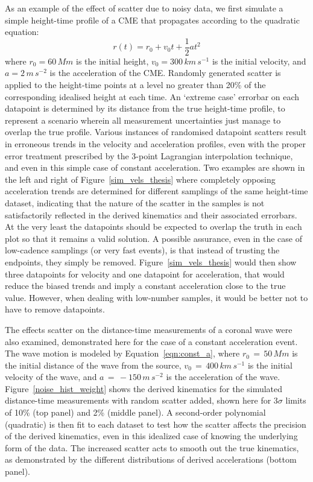 \documentclass[structabstract]{aa}
\begin{document}
As an example of the effect of scatter due to noisy data, we first simulate a simple height-time profile of a CME that propagates according to the quadratic equation:
\begin{equation}
\label{eqn:const_a}
r(t) = r_0 + v_0 t + \frac{1}{2}a t^2
\end{equation}
where $r_0=60\,Mm$ is the initial height, $v_0=300\,km\,s^{-1}$ is the initial velocity, and $a=2\,m\,s^{-2}$ is the acceleration of the CME. Randomly generated scatter is applied to the height-time points at a level no greater than 20\% of the corresponding idealised height at each time. An `extreme case' errorbar on each datapoint is determined by its distance from the true height-time profile, to represent a scenario wherein all measurement uncertainties just manage to overlap the true profile. Various instances of randomised datapoint scatters result in erroneous trends in the velocity and acceleration profiles, even with the proper error treatment prescribed by the 3-point Lagrangian interpolation technique, and even in this simple case of constant acceleration. Two examples are shown in the left and right of Figure~\ref{sim_vels_thesis} where completely opposing acceleration trends are determined for different samplings of the same height-time dataset, indicating that the nature of the scatter in the samples is not satisfactorily reflected in the derived kinematics and their associated errorbars. At the very least the datapoints should be expected to overlap the truth in each plot so that it remains a valid solution. A possible assurance, even in the case of low-cadence samplings (or very fast events), is that instead of trusting the endpoints, they simply be removed. Figure~\ref{sim_vels_thesis} would then show three datapoints for velocity and one datapoint for acceleration, that would reduce the biased trends and imply a constant acceleration close to the true value. However, when dealing with low-number samples, it would be better not to have to remove datapoints.


The effects scatter on the distance-time measurements of a coronal wave were also examined, demonstrated here for the case of a constant acceleration event. The wave motion is modeled by Equation~\ref{eqn:const_a}, where $r_0\,=\,50\,Mm$ is the initial distance of the wave from the source, $v_0\,=\,400\,km\,s^{-1}$ is the initial velocity of the wave, and $a\,=\,-150\,m\,s^{-2}$ is the acceleration of the wave. Figure~\ref{noise_hist_weight} shows the derived kinematics for the simulated distance-time measurements with random scatter added, shown here for 3$\sigma$ limits of 10\% (top panel) and 2\% (middle panel). A second-order polynomial (quadratic) is then fit to each dataset to test how the scatter affects the precision of the derived kinematics, even in this idealized case of knowing the underlying form of the data. The increased scatter acts to smooth out the true kinematics, as demonstrated by the different distributions of derived accelerations (bottom panel).
\end{document}
